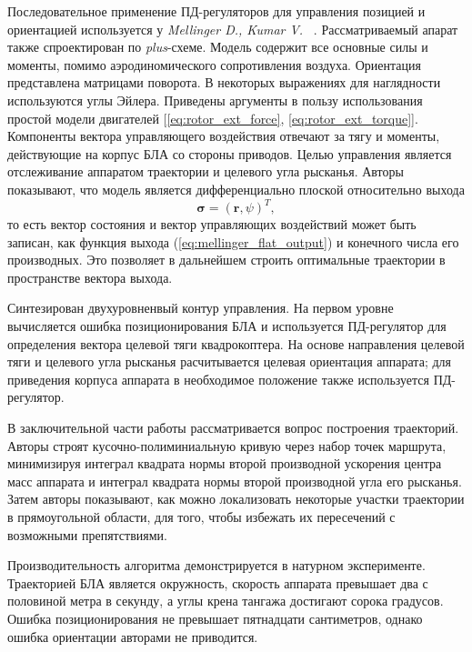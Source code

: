 \documentclass[a4paper,14pt,oneside,openany]{memoir}
\begin{document}
	Последовательное применение ПД-регуляторов для управления позицией и ориентацией используется у \textit{Mellinger D., Kumar V.} ~\cite{Mellinger01}. Рассматриваемый апарат также спроектирован по \textit{plus}-схеме. Модель содержит все основные силы и моменты, помимо аэродиномического сопротивления воздуха. Ориентация представлена матрицами поворота. В некоторых выражениях для наглядности используются углы Эйлера. Приведены аргументы в пользу использования простой модели двигателей [\ref{eq:rotor_ext_force}, \ref{eq:rotor_ext_torque}]. Компоненты вектора управляющего воздействия отвечают за тягу и моменты, действующие на корпус БЛА со стороны приводов. Целью управления является отслеживание аппаратом траектории и целевого угла рысканья. Авторы показывают, что модель является дифференциально плоской относительно выхода
	\begin{equation} \label{eq:mellinger_flat_output}
	\bm{\sigma} = (\bm{r},\psi)^T,
	\end{equation}
	то есть вектор состояния и вектор управляющих воздействий может быть записан, как функция выхода  (\ref{eq:mellinger_flat_output}) и конечного числа его производных. Это позволяет в дальнейшем строить оптимальные траектории в пространстве вектора выхода.
	
	Синтезирован двухуровненвый контур управления. На первом уровне вычисляется ошибка позиционирования БЛА и используется ПД-регулятор для определения вектора целевой тяги квадрокоптера. На основе направления целевой тяги и целевого угла рысканья расчитывается целевая ориентация аппарата; для приведения корпуса аппарата в необходимое положение также используется ПД-регулятор.
	
	В заключительной части работы рассматривается вопрос построения траекторий. Авторы строят кусочно-полиминиальную кривую через набор точек маршрута, минимизируя интеграл квадрата нормы второй производной ускорения центра масс аппарата и интеграл квадрата нормы второй производной угла его рысканья. Затем  авторы показывают, как можно локализовать некоторые участки траектории в прямоугольной области, для того, чтобы избежать их пересечений с возможными препятствиями.
	
	Производительность алгоритма демонстрируется в натурном эксперименте. Траекторией БЛА является окружность, скорость аппарата превышает два с половиной метра в секунду, а углы крена тангажа достигают сорока градусов. Ошибка позиционирования не превышает пятнадцати сантиметров, однако ошибка ориентации авторами не приводится.
	
\end{document}
